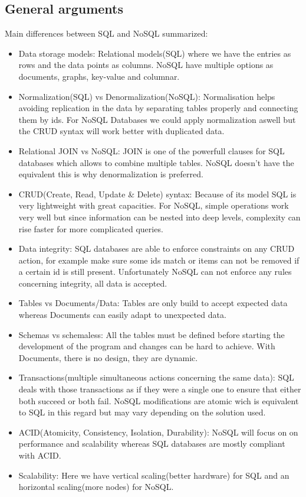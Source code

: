 \documentclass[8pt]{article}
\begin{document}
\subsection{General arguments}
Main differences between SQL and NoSQL summarized:
\begin{itemize}
\item Data storage models: Relational models(SQL) where we have the entries as rows and the data points as columns.   NoSQL have multiple options as documents, graphs, key-value and columnar.\cite{McNulty-Holmes:2014}
\item Normalization(SQL) vs Denormalization(NoSQL): Normalisation helps avoiding replication in the data by separating tables properly and connecting them by ids. For NoSQL Databases we could apply normalization aswell but the CRUD syntax will work better with duplicated data.\cite{Buckler:2015}
\item Relational JOIN vs NoSQL: JOIN is one of the powerfull clauses for SQL databases which allows to combine multiple tables. NoSQL doesn't have the equivalent this is why denormalization is preferred.\cite{Buckler:2015}
\item CRUD(Create, Read, Update \& Delete) syntax: Because of its model SQL is very lightweight with great capacities. For NoSQL, simple operations work very well but since information can be nested into deep levels, complexity can rise faster for more complicated queries.\cite{Buckler:2015}
\item Data integrity: SQL databases are able to enforce constraints on any CRUD action, for example make sure some ids match or items can not be removed if a certain id is still present. Unfortunately NoSQL can not enforce any rules concerning integrity, all data is accepted.\cite{Buckler:2015}
\item Tables vs Documents/Data: Tables are only build to accept expected data whereas Documents can easily adapt to unexpected data.\cite{Gentz:2016}
\item Schemas vs schemaless: All the tables must be defined before starting the development of the program and changes can be hard to achieve. With Documents, there is no design, they are dynamic.\cite{Gentz:2016} \cite{Buckler:2015}
\item Transactions(multiple simultaneous actions concerning the same data): SQL deals with those transactions as if they were a single one to ensure that either both succeed or both fail. NoSQL modifications are atomic wich is equivalent to SQL in this regard but may vary depending on the solution used. \cite{Buckler:2015} \cite{Gentz:2016}
\item ACID(Atomicity, Consistency, Isolation, Durability): NoSQL will focus on on performance and scalability whereas SQL databases are mostly compliant with ACID.
\item Scalability: Here we have vertical scaling(better hardware) for SQL and an horizontal scaling(more nodes) for NoSQL.\cite{Gentz:2016} \cite{Buckler:2015} \cite{McNulty-Holmes:2014}


\end{itemize}
\end{document}
